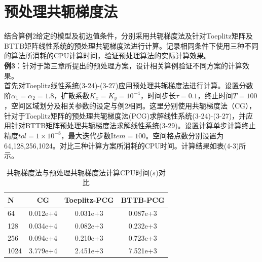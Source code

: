 \documentclass[twoside,UTF8]{nputhesis}
\begin{document}
\section{预处理共轭梯度法}
结合算例2给定的模型及初边值条件，分别采用共轭梯度法及针对Toeplitz矩阵及BTTB矩阵线性系统的预处理共轭梯度法进行计算。记录相同条件下使用三种不同的算法所消耗的CPU计算时间，验证预处理算法的实际计算效果。\\
\noindent   %
\textbf{例3}：针对于第三章所提出的预处理方案，设计相关算例验证不同方案的计算效果。\\
首先对Toeplitz线性系统(3-24)-(3-27)应用预处理共轭梯度法进行计算。设置分数阶${{\alpha }_{1}}={{\alpha}_{2}}=1.8$，扩散系数${{K}_{x}}={{K}_{y}}={{10}^{-4}}$，时间步长$\tau =0.1$，终止时间$T=100$，空间区域划分及相关参数的设定与例2相同。这里分别使用共轭梯度法（CG），针对于Toeplitz矩阵的预处理共轭梯度法(PCG)求解线性系统(3-24)-(3-27)，并应用针对BTTB矩阵预处理共轭梯度法求解线性系统(3-29)。设置计算单步计算终止精度$tol=1\times {{10}^{-8}}$，最大迭代步数$\text{I}tem=100$。空间格点数分别设置为64,128,256,1024。对比三种计算方案所消耗的CPU时间。计算结果如表(4-3)所示。
\begin{table}[h]
	\centering


	\caption[labelTabtab1]{共轭梯度法与预处理共轭梯度法计算CPU时间($s$)对比}
	\renewcommand\tabcolsep{1em}
	\begin{tabular}{l|ccc}
		\toprule
		{N} &  {CG} & {Toeplitz-PCG } & {BTTB-PCG} \\
		\hline\hline
		64 & 0.012e+4 & 0.031e+3 & 0.087e+3\\
		128 & 0.034e+4 & 0.082e+3 & 0.232e+3\\
		256 & 0.094e+4	 & 0.210e+3 & 0.723e+3\\
		1024 & 3.779e+4 & 2.451e+3 & 7.521e+3\\
		
		\bottomrule
		\bottomrule
	\end{tabular}
\end{table}
\end{document}
